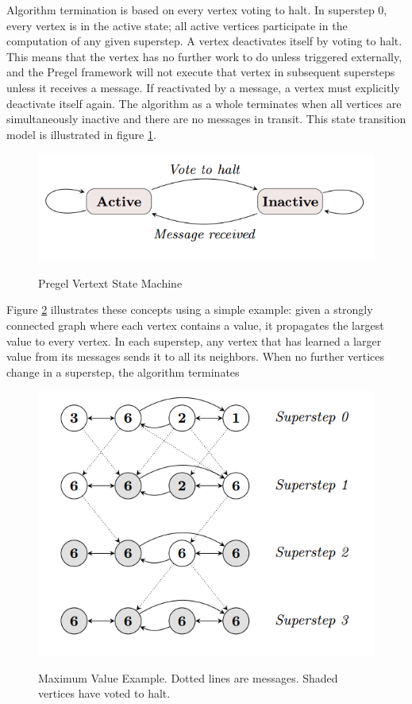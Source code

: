 \documentclass {report}
\begin{document}
Algorithm termination is based on every vertex voting to
halt. In superstep 0, every vertex is in the active state; all
active vertices participate in the computation of any given
superstep. A vertex deactivates itself by voting to halt. This
means that the vertex has no further work to do unless triggered externally, and the Pregel framework will not execute
that vertex in subsequent supersteps unless it receives a message. If reactivated by a message, a vertex must explicitly deactivate itself again. The algorithm as a whole terminates
when all vertices are simultaneously inactive and there are
no messages in transit. This state transition model is illustrated in figure \ref{SMachine}.


\begin{figure}
  \centering
  \includegraphics[width=\textwidth]{pregel_vertext_machine.PNG}\\
  \caption{Pregel Vertext State Machine}\label{SMachine}
\end{figure}

Figure \ref{pregel_max} illustrates these concepts using a simple example:
given a strongly connected graph where each vertex contains
a value, it propagates the largest value to every vertex. In
each superstep, any vertex that has learned a larger value
from its messages sends it to all its neighbors. When no
further vertices change in a superstep, the algorithm terminates
\begin{figure}
  \centering
  \includegraphics[width=\textwidth]{pregel_max_example.PNG}\\
  \caption{Maximum Value Example. Dotted lines
are messages. Shaded vertices have voted to halt.}\label{pregel_max}
\end{figure}
\end{document}
